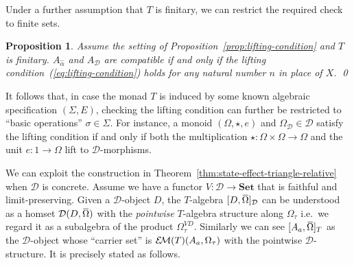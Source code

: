 \documentclass[9pt, preprint]{sigplanconf}
\theoremstyle{theorem}
\newtheorem{proposition}[theorem]{Proposition}
\theoremstyle{definition}
\newcommand{\cat}[1]{\mathcal{#1}}
\renewcommand{\bar}{\overbar}
\newcommand{\overbar}[1]{\mkern 1.5mu\overline{\mkern-1.5mu#1\mkern-1.5mu}\mkern 1.5mu}
\newcommand{\Set}{\mathbf{Set}}
\newcommand{\EM}{\mathcal{E}{\kern-.5ex}\mathcal{M}}
\newcommand{\OmegaD}{\Omega_{\cat{D}}}
\begin{document}
Under a further assumption that $T$ is finitary, we can restrict the
required check to finite sets.





\begin{proposition}
Assume the setting of Proposition~\ref{prop:lifting-condition} and $T$ is finitary.
 $A_{\hat{\alpha}}$ and $A_{\cat{D}}$ are compatible
  if and only if the lifting condition~(\ref{eq:lifting-condition}) holds
 for any natural number $n$ in place of $X$.
\qed
\end{proposition}


\noindent
It follows that, in case the monad $T$ is  induced by some known
algebraic specification $(\Sigma,E)$,   checking
 the lifting condition can further be restricted to ``basic
operations''  $\sigma \in \Sigma$.
For instance, a monoid $(\Omega, \star, e)$ and
 $\OmegaD \in \cat{D}$
satisfy the lifting condition
if and only if both
the multiplication $\star \colon \Omega \times \Omega \to \Omega$ and
the unit $e \colon 1 \to \Omega$ lift to $\cat{D}$-morphisms.




We can exploit the construction in Theorem~\ref{thm:state-effect-triangle-relative}
when $\cat{D}$ is concrete.
Assume we have a  functor $V \colon \cat{D} \to \Set$ that is faithful
and limit-preserving.
Given a $\cat{D}$-object $D$, the $T$-algebra $[D, \bar{\Omega}]_{\cat{D}}$
can be understood as a homset $\cat{D}(D, \bar{\Omega})$
with the \emph{pointwise} $T$-algebra structure along $\Omega_{\tau}$
i.e.\ we regard it as a subalgebra of the product $\Omega_{\tau}^{VD}$.
Similarly we can see $[A_a, \bar{\Omega}]_{T}$ as the $\cat{D}$-object
whose ``carrier set'' is $\EM(T)(A_a, \Omega_{\tau})$ with the pointwise $\cat{D}$-structure.
It is precisely stated as follows.
\end{document}
